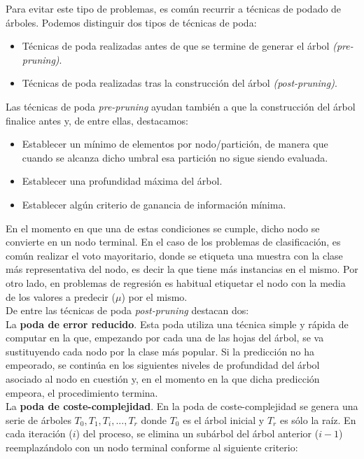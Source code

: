 Para evitar este tipo de problemas, es común recurrir a técnicas de podado de árboles. Podemos distinguir dos tipos de técnicas de poda:

\begin{itemize}
	\item Técnicas de poda realizadas antes de que se termine de generar el árbol \textit{(pre-pruning)}.
	\item Técnicas de poda realizadas tras la construcción del árbol \textit{(post-pruning)}.
\end{itemize}

Las técnicas de poda \textit{pre-pruning} ayudan también a que la construcción del árbol finalice antes y, de entre ellas, destacamos:

\begin{itemize}
	\item Establecer un mínimo de elementos por nodo/partición, de manera que cuando se alcanza dicho umbral esa partición no sigue siendo evaluada.
	\item Establecer una profundidad máxima del árbol.
	\item Establecer algún criterio de ganancia de información mínima.
\end{itemize}

En el momento en que una de estas condiciones se cumple, dicho nodo se convierte en un nodo terminal. En el caso de los problemas de clasificación, es común realizar el voto mayoritario, donde se etiqueta una muestra con la clase más representativa del nodo, es decir la que tiene más instancias en el mismo. Por otro lado, en problemas de regresión es habitual etiquetar el nodo con la media de los valores a predecir ($\mu$) por el mismo.\\

De entre las técnicas de poda \textit{post-pruning} destacan dos:\\

La \textbf{poda de error reducido}. Esta poda utiliza una técnica simple y rápida de computar en la que, empezando por cada una de las hojas del árbol, se va sustituyendo cada nodo por la clase más popular. Si la predicción no ha empeorado, se continúa en los siguientes niveles de profundidad del árbol asociado al nodo en cuestión y, en el momento en la que dicha predicción empeora, el procedimiento termina.\\

La \textbf{poda de coste-complejidad}. En la poda de coste-complejidad se genera una serie de árboles $T_0, T_1, T_i, ... , T_r$ donde $T_0$ es el árbol inicial y $T_r$ es sólo la raíz. En cada iteración ($i$) del proceso, se elimina un subárbol del árbol anterior ($i-1$) reemplazándolo con un nodo terminal conforme al siguiente criterio:

